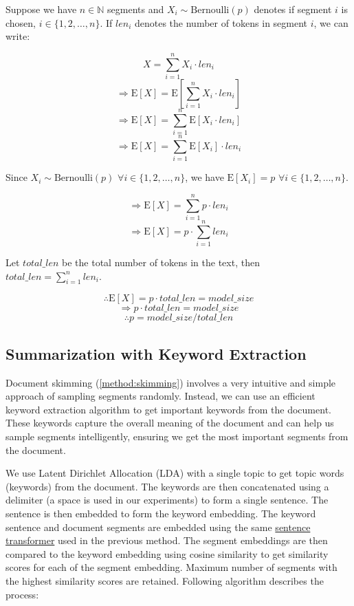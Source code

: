 		Suppose we have $n \in \mathbb{N}$ segments and $X_i \sim \mathrm{Bernoulli}(p)$ denotes
		if segment $i$ is chosen, $i \in \{1, 2, \dots, n\}$.
		If $len_i$ denotes the number of tokens in segment $i$, we can write:

		\[ X = \sum_{i = 1}^{n} X_i \cdot len_i \]
		\[ \Rightarrow \mathrm{E}[X] = \mathrm{E}[\sum_{i = 1}^{n} X_i \cdot len_i] \]
		\[ \Rightarrow \mathrm{E}[X] = \sum_{i = 1}^{n} \mathrm{E}[X_i \cdot len_i] \]
		\[ \Rightarrow \mathrm{E}[X] = \sum_{i = 1}^{n} \mathrm{E}[X_i] \cdot len_i \]

		Since $X_i \sim \mathrm{Bernoulli}(p)$ $\forall i \in \{1, 2, \dots, n\}$, we
		have $\mathrm{E}[X_i] = p$ $\forall i \in \{1, 2, \dots, n\}$.

		\[ \Rightarrow \mathrm{E}[X] = \sum_{i = 1}^{n} p \cdot len_i \]
		\[ \Rightarrow \mathrm{E}[X] = p \cdot \sum_{i = 1}^{n} len_i \]

		Let $total\_len$ be the total number of tokens in the text, then
		$total\_len = \sum_{i = 1}^{n} len_i$.

		\[ \therefore \mathrm{E}[X] = p \cdot total\_len = model\_size \]
		\[ \Rightarrow p \cdot total\_len = model\_size \]
		\[ \therefore p = model\_size / total\_len \]


	\subsection{Summarization with Keyword Extraction}
		\label{method:keyword}

		Document skimming (\ref{method:skimming}) involves a very intuitive and simple approach of
		sampling segments randomly.
		Instead, we can use an efficient keyword extraction algorithm to get important keywords
		from the document.
		These keywords capture the overall meaning of the document and can help us sample segments
		intelligently, ensuring we get the most important segments from the document.

		We use Latent Dirichlet Allocation (LDA) \cite{blei2003latent} with a single topic to get topic
		words (keywords) from the document.
		The keywords are then concatenated using a delimiter (a space is used in our experiments) to
		form a single sentence.
		The sentence is then embedded to form the keyword embedding.
		The keyword sentence and document segments are embedded using the same
		\href{https://huggingface.co/sentence-transformers/all-MiniLM-L6-v2}{sentence transformer}
		used in the previous method.
		The segment embeddings are then compared to the keyword embedding using cosine similarity
		to get similarity scores for each of the segment embedding.
		Maximum number of segments with the highest similarity scores are retained.
		Following algorithm describes the process:

